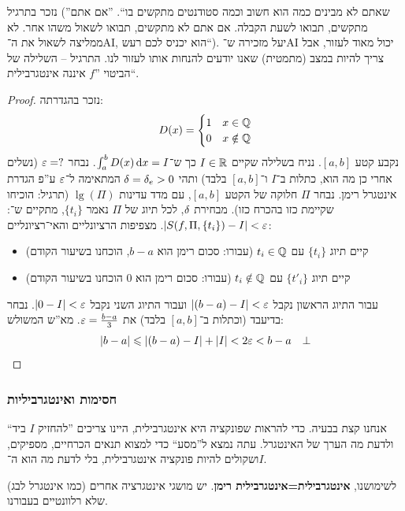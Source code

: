 \documentclass[name=רשימות חדו''א 2א]{../../../tex/classes/noChapterMegasumPreamble}
\begin{document}
	נזכר בתרגיל (''שאתם לא מבינים כמה הוא חשוב וכמה סטודנטים מתקשים בו``. ''אם אתם מתקשים, תבואו לשעת הקבלה. אם אתם לא מתקשים, תבואו לשאול משהו אחר. לא ממליצה לשאול את ה־AI, הוא יכניס לכם רעש``). יעל מזכירה ש־AI יכול מאוד לעזור, אבל צריך להיות במצב (מתמטית) שאנו יודעים להנחות אותו לעזור לנו. התרגיל – השלילה של הביטוי ''$f$ איננה אינטגרבילית``.

	\begin{proof}
		נזכר בהגדרתה:
		\[ D(x) = \begin{cases}
			1 & x \in \mathbb{Q} \\
			0 & x \notin \mathbb{Q}
		\end{cases} \]
		נקבע קטע $[a, b]$. נניח בשלילה שקיים $I \in \mathbb{R}$  כך ש־$\int^b_a D(x) \,\mathrm{d}x = I$. נבחר $\eg = ?$ (נשלים אחרי כן מה הוא, כתלות ב־$I$ ו־$[a, b]$ בלבד) ותהי $\delta = \delta_e > 0$ המתאימה ל־$\eg$ ע''פ הגדרת אינטגרל רימן. נבחר $\Pi$ חלוקה של הקטע $[a, b]$, עם מדד עדינות $\lg(\Pi)$ (תרגיל: הוכיחו שקיימת כזו בהכרח כזו). מבחירת $\delta$, לכל תיוג של $\Pi$ נאמר $\{t_i\}$, מתקיים ש־: $\sof{S(f, \Pi, \{t_i\}) - I} < \eg$. מצפיפות הרציונליים והאי־רציונליים:
		\begin{itemize}
			\item קיים תיוג $\{t_i\}$ עם $t_i \in \mathbb{Q}$ (עבורו: סכום רימן הוא $b - a$, הוכחנו בשיעור הקודם)
			\item קיים תיוג $\{t'_i\}$ עם $t_i \notin \mathbb{Q}$ (עבורו: סכום רימן הוא $0$ הוכחנו בשיעור הקודם)
		\end{itemize}
		עבור התיוג הראשון נקבל $\sof{(b - a) - I} < \eg$ ועבור התיוג השני נקבל $\sof{0 - I} < \eg$. נבחר בדיעבד (וכתלות ב־$[a, b]$ בלבד) את $\eg = \frac{b - a}{3}$. מא''ש המשולש:
		\[ \sof{b - a} \le \sof{(b - a) - I} + \sof I < 2 \eg < b - a\quad \bot \]\envendproof
	\end{proof}



\subsubsection{חסימות ואינטגרביליות}
	אנחנו קצת בבעיה. כדי להראות שפונקציה היא אינטגרבילית, היינו צריכים ''להחזיק $I$ ביד`` ולדעת מה הערך של האינטגרל. עתה נמצא ל''מסע`` כדי למצוא תנאים הכרחיים, מספיקים, ושקולים להיות פונקציה אינטגרבילית, בלי לדעת מה הוא ה־$I$.

	לשימושנו, \textbf{אינטגרבילית=אינטגרבילית רימן}. יש מושגי אינטגרציה אחרים (כמו אינטגרל לבג) שלא רלוונטיים בעבורנו. 
	
\end{document}
